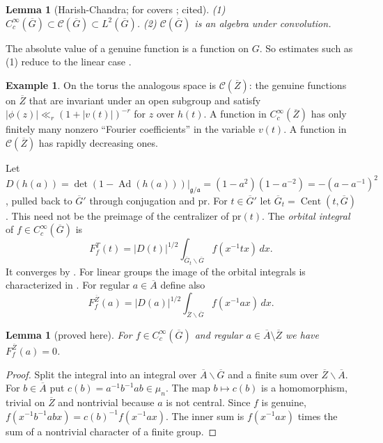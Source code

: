 \documentclass[12pt,letterpaper]{article}
\numberwithin{equation}{section}
\newtheorem{lemma}[theorem]{Lemma}
\theoremstyle{definition}
\newtheorem{xexample}[theorem]{Example}
\newcommand{\proved}{proved here}
\newcommand{\cited}{cited}
\newcommand{\bG}{\overline{G}}
\newcommand{\bA}{\overline{A}}
\newcommand{\bZ}{\overline{Z}}
\newcommand{\pr}{\mathrm{pr}}
\newcommand{\calC}{\mathcal C}
\DeclareMathOperator{\Ad}{Ad}
\DeclareMathOperator{\Cent}{Cent}
\begin{document}
\begin{lemma}[Harish-Chandra; for covers \cite{Li12}; \cited]\label{lem:schwartz-alg}
(1) $C_c^\infty(\bG)\subset\calC(\bG)\subset L^2(\bG)$.
(2) $\calC(\bG)$ is an algebra under convolution.
\end{lemma}
The absolute value of a genuine function is a function on $G$.  So estimates such as (1)
reduce to the linear case \cite[\S4.4]{Si79}.

\begin{xexample}
On the torus the analogous space is $\calC(\bZ)$: the genuine functions on $\bZ$ that are
invariant under an open subgroup and satisfy $|\phi(z)|\ll_r(1+|v(t)|)^{-r}$ for $z$ over
$h(t)$.  A function in $C_c^\infty(\bZ)$ has only finitely many nonzero ``Fourier
coefficients'' in the variable $v(t)$.  A function in $\calC(\bZ)$ has rapidly decreasing
ones.
\end{xexample}

Let $D(h(a))=\det(1-\Ad(h(a)))|_{\mathfrak g/\mathfrak a}=(1-a^2)(1-a^{-2})=-(a-a^{-1})^2$,
pulled back to $\bG'$ through conjugation and $\pr$.  For $t\in\bG'$ let
$\bG_t=\Cent(t,\bG)$.  This need not be the preimage of the centralizer of $\pr(t)$.  The
\emph{orbital integral} of $f\in C_c^\infty(\bG)$ is
\begin{equation}\label{eq:orbital}
F_f^{T}(t)=|D(t)|^{1/2}\int_{\bG_t\backslash\bG}f(x^{-1}tx)\,dx .
\end{equation}
It converges by \cite{HC70}.  For linear groups the image of the orbital integrals is
characterized in \cite{Vi81}.  For regular $a\in\bA$ define also
\begin{equation}\label{eq:orbital-Z}
F_f^{\bZ}(a)=|D(a)|^{1/2}\int_{\bZ\backslash\bG}f(x^{-1}ax)\,dx .
\end{equation}

\begin{lemma}[\proved]\label{lem:vanish}
For $f\in C_c^\infty(\bG)$ and regular $a\in\bA\setminus\bZ$ we have $F_f^{\bZ}(a)=0$.
\end{lemma}
\begin{proof}
Split the integral into an integral over $\bA\backslash\bG$ and a finite sum over
$\bZ\backslash\bA$.  For $b\in\bA$ put $c(b)=a^{-1}b^{-1}ab\in\mu_n$.  The map $b\mapsto c(b)$ is
a homomorphism, trivial on $\bZ$ and nontrivial because $a$ is not central.  Since $f$ is
genuine, $f(x^{-1}b^{-1}abx)=c(b)^{-1}f(x^{-1}ax)$.  The inner sum is $f(x^{-1}ax)$ times the
sum of a nontrivial character of a finite group.
\end{proof}
\end{document}
